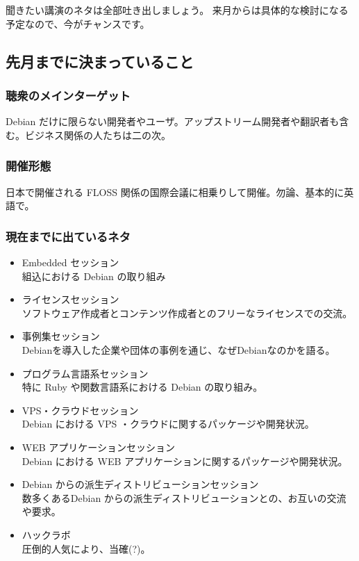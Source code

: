 \documentclass[mingoth,a4paper]{jsarticle}
\begin{document}
聞きたい講演のネタは全部吐き出しましょう。
来月からは具体的な検討になる予定なので、今がチャンスです。

\subsection{先月までに決まっていること}
\subsubsection{聴衆のメインターゲット}
Debian だけに限らない開発者やユーザ。アップストリーム開発者や翻訳者も含む。ビジネス関係の人たちは二の次。

\subsubsection{開催形態}
日本で開催される FLOSS 関係の国際会議に相乗りして開催。勿論、基本的に英語で。

\subsubsection{現在までに出ているネタ}
\begin{itemize}
 \item Embedded セッション\\
       組込における Debian の取り組み
 \item ライセンスセッション\\
       ソフトウェア作成者とコンテンツ作成者とのフリーなライセンスでの交流。
 \item 事例集セッション\\
       Debianを導入した企業や団体の事例を通じ、なぜDebianなのかを語る。
 \item プログラム言語系セッション\\
特に Ruby や関数言語系における Debian の取り組み。
 \item VPS・クラウドセッション\\
Debian における VPS ・クラウドに関するパッケージや開発状況。
 \item WEB アプリケーションセッション\\
Debian における WEB アプリケーションに関するパッケージや開発状況。
 \item Debian からの派生ディストリビューションセッション\\
数多くあるDebian からの派生ディストリビューションとの、お互いの交流や要求。
 \item ハックラボ\\
圧倒的人気により、当確(?)。
\end{itemize}
\end{document}
